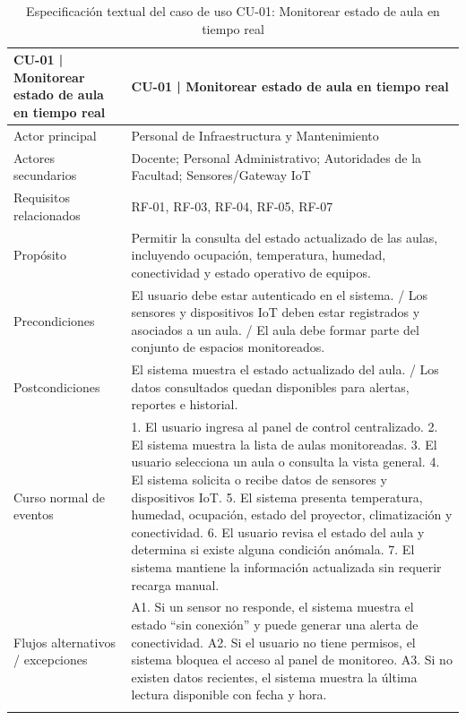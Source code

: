 \begingroup
\small
\begin{longtable}{|p{7.8cm}|p{7.8cm}|}
\hline
CU-01 | Monitorear estado de aula en tiempo real & CU-01 | Monitorear estado de aula en tiempo real \\ \hline
Actor principal & Personal de Infraestructura y Mantenimiento \\ \hline
Actores secundarios & Docente; Personal Administrativo; Autoridades de la Facultad; Sensores/Gateway IoT \\ \hline
Requisitos relacionados & RF-01, RF-03, RF-04, RF-05, RF-07 \\ \hline
Propósito & Permitir la consulta del estado actualizado de las aulas, incluyendo ocupación, temperatura, humedad, conectividad y estado operativo de equipos. \\ \hline
Precondiciones & El usuario debe estar autenticado en el sistema. / Los sensores y dispositivos IoT deben estar registrados y asociados a un aula. / El aula debe formar parte del conjunto de espacios monitoreados. \\ \hline
Postcondiciones & El sistema muestra el estado actualizado del aula. / Los datos consultados quedan disponibles para alertas, reportes e historial. \\ \hline
Curso normal de eventos & 1. El usuario ingresa al panel de control centralizado. 2. El sistema muestra la lista de aulas monitoreadas. 3. El usuario selecciona un aula o consulta la vista general. 4. El sistema solicita o recibe datos de sensores y dispositivos IoT. 5. El sistema presenta temperatura, humedad, ocupación, estado del proyector, climatización y conectividad. 6. El usuario revisa el estado del aula y determina si existe alguna condición anómala. 7. El sistema mantiene la información actualizada sin requerir recarga manual. \\ \hline
Flujos alternativos / excepciones & A1. Si un sensor no responde, el sistema muestra el estado ``sin conexión'' y puede generar una alerta de conectividad. A2. Si el usuario no tiene permisos, el sistema bloquea el acceso al panel de monitoreo. A3. Si no existen datos recientes, el sistema muestra la última lectura disponible con fecha y hora. \\ \hline
\caption{Especificación textual del caso de uso CU-01: Monitorear estado de aula en tiempo real}
\end{longtable}
\endgroup

